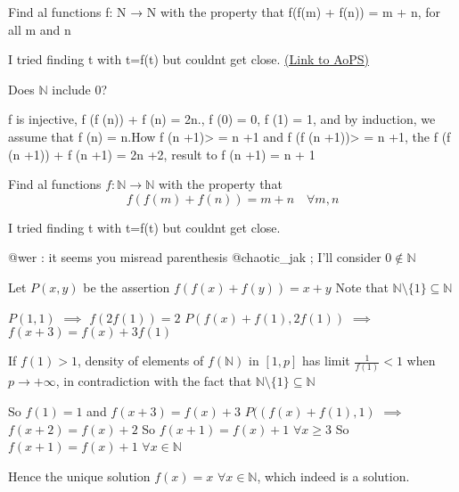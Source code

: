 \begin{problem}
	Find al functions f: N → N with the property that
f(f(m) + f(n)) = m + n, for all m and n

I tried finding t with t=f(t) but couldnt get close.
	\flushright \href{https://artofproblemsolving.com/community/c6h560671}{(Link to AoPS)}
\end{problem}



\begin{solution}
	Does $\mathbb{N}$ include $0$?
\end{solution}



\begin{solution}
	f is injective, f (f (n)) + f (n) = 2n., f (0) = 0, f (1) = 1, and by induction, we assume that f (n) = n.How
f (n +1)> = n +1 and f (f (n +1))> = n +1, the f (f (n +1)) + f (n +1) = 2n +2, result to f (n +1) = n + 1
\end{solution}



\begin{solution}
	\begin{tcolorbox}Find al functions $f: \mathbb{N} \to \mathbb{N}$ with the property that
\[f(f(m) + f(n)) = m + n \quad \forall m ,n\]

I tried finding t with t=f(t) but couldnt get close.\end{tcolorbox}
@wer : it seems you misread parenthesis
@chaotic_jak ; I'll consider $0\notin \mathbb N$

Let $P(x,y)$ be the assertion $f(f(x)+f(y))=x+y$
Note that $\mathbb N\setminus\{1\}\subseteq \mathbb N$

$P(1,1)$ $\implies$ $f(2f(1))=2$
$P(f(x)+f(1),2f(1))$ $\implies$ $f(x+3)=f(x)+3f(1)$

If $f(1)>1$, density of elements of $f(\mathbb N)$ in $[1,p]$ has limit $\frac 1{f(1)}<1$ when $p\to+\infty$, in contradiction with the fact that $\mathbb N\setminus\{1\}\subseteq \mathbb N$

So $f(1)=1$ and $f(x+3)=f(x)+3$
$P((f(x)+f(1),1)$ $\implies$ $f(x+2)=f(x)+2$
So $f(x+1)=f(x)+1$ $\forall x\ge 3$
So $f(x+1)=f(x)+1$ $\forall x\in\mathbb N$

Hence the unique solution $\boxed{f(x)=x}$ $\forall x\in\mathbb N$, which indeed is a solution.
\end{solution}



